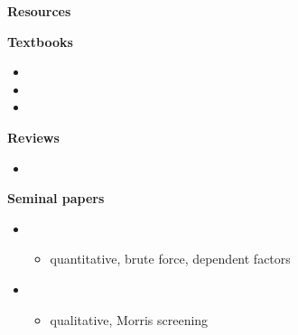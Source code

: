 \begin{frame}\begin{center}
		\LARGE\textbf{Resources}
\end{center}\end{frame}
\begin{frame}\textbf{Textbooks}\vspace{0.3cm}

\begin{itemize}\small
\item {}
\item {}
\item {}
\end{itemize}

\end{frame}
\begin{frame}\textbf{Reviews}\vspace{0.3cm}

\begin{itemize}\small
\item {}
\end{itemize}

\end{frame}
\begin{frame}\textbf{Seminal papers}\vspace{0.3cm}

\begin{itemize}\small
\item {}\vspace{0.3cm}
\begin{itemize}\footnotesize
 	\item \footnotesize quantitative, brute force, dependent factors\vspace{0.3cm}
\end{itemize}
\item {}\vspace{0.3cm}
\begin{itemize}\footnotesize
	\item \footnotesize qualitative, Morris screening\vspace{0.3cm}
\end{itemize}
\end{itemize}

\end{frame}
